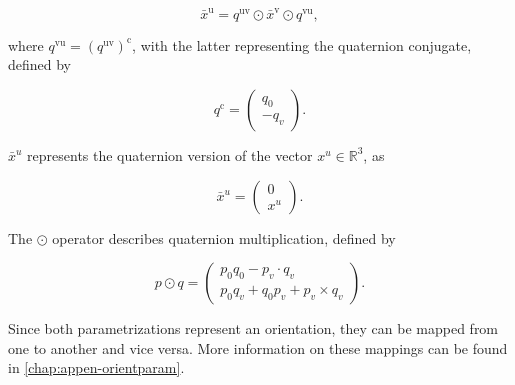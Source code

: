 \begin{equation}
	\label{eq:quat_rot}
	\bar{x}^{\mathrm{u}}=q^{\mathrm{uv}} \odot \bar{x}^{\mathrm{v}} \odot q^{\mathrm{vu}},
\end{equation}

where $q^{\mathrm{vu}} = \left(q^{\mathrm{uv}}\right)^{\mathrm{c}}$, with the latter representing the quaternion conjugate, defined by 

\begin{equation}
	\label{eq:quat_conjugate}
	q^{\mathrm{c}}=\left(\begin{array}{c}{q_{0}} \\ {-q_{v}}\end{array}\right).
\end{equation}

$\bar{x}^u$ represents the quaternion version of the vector $x^u \in \mathbb{R}^3$, as

\begin{equation}
	\label{eq:quat_vec_ref}
	\bar{x}^u=\left(\begin{array}{l}{0} \\ {x^u}\end{array}\right).
\end{equation}


The $\odot$ operator describes quaternion multiplication, defined by

\begin{equation}
	\label{eq:quat_multiplication}
	p \odot q=\left(\begin{array}{c}{p_{0} q_{0}-p_{v} \cdot q_{v}} \\ {p_{0} q_{v}+q_{0} p_{v}+p_{v} \times q_{v}}\end{array}\right).
\end{equation}

Since both parametrizations represent an orientation, they can be mapped from one to another and vice versa. More information on these mappings can be found in \cref{chap:appen-orientparam}.

